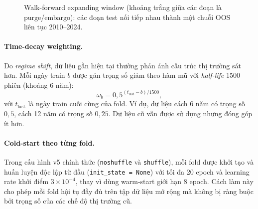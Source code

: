 \documentclass[a4paper,12pt]{article}
\begin{document}
\begin{figure}[H]\centering
{}
\caption[Walk-forward expanding window]{Walk-forward expanding window (khoảng trắng giữa các đoạn là purge/embargo): các đoạn test nối tiếp nhau thành một chuỗi OOS liên tục 2010--2024.}
\label{fig:wf}
\end{figure}

\paragraph{Time-decay weighting.} Do \textit{regime shift}, dữ liệu gần hiện tại thường phản ánh cấu trúc thị trường sát hơn. Mỗi ngày train $b$ được gán trọng số giảm theo hàm mũ với \textit{half-life} 1500 phiên (khoảng 6 năm):
\begin{equation}
    \omega_b = 0{,}5^{(t_{\mathrm{last}}-b)/1500},
\end{equation}
với $t_{\mathrm{last}}$ là ngày train cuối cùng của fold. Ví dụ, dữ liệu cách 6 năm có trọng số $0{,}5$, cách 12 năm có trọng số $0{,}25$. Dữ liệu cũ vẫn được sử dụng nhưng đóng góp ít hơn.

\paragraph{Cold-start theo từng fold.} Trong cấu hình v5 chính thức (\texttt{noshuffle} và \texttt{shuffle}), mỗi fold được khởi tạo và huấn luyện độc lập từ đầu (\texttt{init\_state = None}) với tối đa 20 epoch và learning rate khởi điểm $3\times10^{-4}$, thay vì dùng warm-start giới hạn 8 epoch. Cách làm này cho phép mỗi fold hội tụ đầy đủ trên tập dữ liệu mở rộng mà không bị ràng buộc bởi trọng số của các chế độ thị trường cũ.
\end{document}
